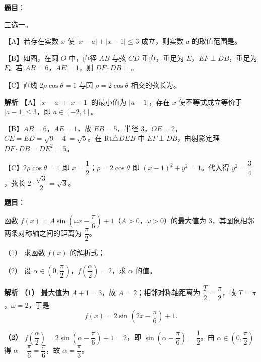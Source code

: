 \begin{answer}

\textbf{题目}：

三选一。

【A】若存在实数 $x$ 使 $|x-a|+|x-1|\leqslant3$ 成立，则实数 $a$ 的取值范围是\gkblank{}。

【B】如图，在圆 $O$ 中，直径 $AB$ 与弦 $CD$ 垂直，垂足为 $E$，$EF\perp DB$，垂足为 $F$。若 $AB=6$，$AE=1$，则 $DF\cdot DB=$\gkblank{}。
\nopagebreak[4]
\begin{center}\end{center}
\nopagebreak[4]
【C】直线 $2\rho\cos\theta=1$ 与圆 $\rho=2\cos\theta$ 相交的弦长为\gkblank{}。

\textbf{解析}
【A】$|x-a|+|x-1|$ 的最小值为 $|a-1|$，存在 $x$ 使不等式成立等价于 $|a-1|\leqslant3$，即 $a\in[-2,4]$。

【B】$AB=6$，$AE=1$，故 $EB=5$，半径 $3$，$OE=2$，$CE=ED=\sqrt{9-4}=\sqrt5$。在 $\mathrm{Rt}\triangle DEB$ 中 $EF\perp DB$，由射影定理 $DF\cdot DB=DE^2=5$。

【C】$2\rho\cos\theta=1$ 即 $x=\dfrac12$；$\rho=2\cos\theta$ 即 $(x-1)^2+y^2=1$。代入得 $y^2=\dfrac34$，弦长 $2\cdot\dfrac{\sqrt3}2=\sqrt3$。


\end{answer}
\begin{answer}

\textbf{题目}：

函数 $f(x)=A\sin\left(\omega x-\dfrac\pi6\right)+1$（$A>0$，$\omega>0$）的最大值为 $3$，其图象相邻两条对称轴之间的距离为 $\dfrac\pi2$。

（1） 求函数 $f(x)$ 的解析式；

（2） 设 $\alpha\in\left(0,\dfrac\pi2\right)$，$f\left(\dfrac\alpha2\right)=2$，求 $\alpha$ 的值。

\textbf{解析}
\textbf{（1）} 最大值为 $A+1=3$，故 $A=2$；相邻对称轴距离为 $\dfrac T2=\dfrac\pi2$，故 $T=\pi$，$\omega=2$，于是
\nopagebreak[4]
\[f(x)=2\sin\left(2x-\frac\pi6\right)+1.\]

\textbf{（2）} $f\left(\dfrac\alpha2\right)=2\sin\left(\alpha-\dfrac\pi6\right)+1=2$，即 $\sin\left(\alpha-\dfrac\pi6\right)=\dfrac12$。由 $\alpha\in\left(0,\dfrac\pi2\right)$ 得 $\alpha-\dfrac\pi6=\dfrac\pi6$，故 $\alpha=\dfrac\pi3$。



\end{answer}
